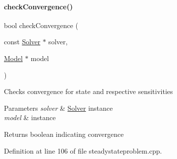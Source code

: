 \paragraph{\texorpdfstring{check\+Convergence()}{checkConvergence()}}
{\footnotesize\ttfamily bool check\+Convergence (\begin{DoxyParamCaption}\item[{const \mbox{\hyperlink{classamici_1_1_solver}{Solver}} $\ast$}]{solver,  }\item[{\mbox{\hyperlink{classamici_1_1_model}{Model}} $\ast$}]{model }\end{DoxyParamCaption})}

Checks convergence for state and respective sensitivities


\begin{DoxyParams}{Parameters}
{\em solver} & \mbox{\hyperlink{classamici_1_1_solver}{Solver}} instance \\
\hline
{\em model} & instance \\
\hline
\end{DoxyParams}
\begin{DoxyReturn}{Returns}
boolean indicating convergence 
\end{DoxyReturn}


Definition at line 106 of file steadystateproblem.\+cpp.

